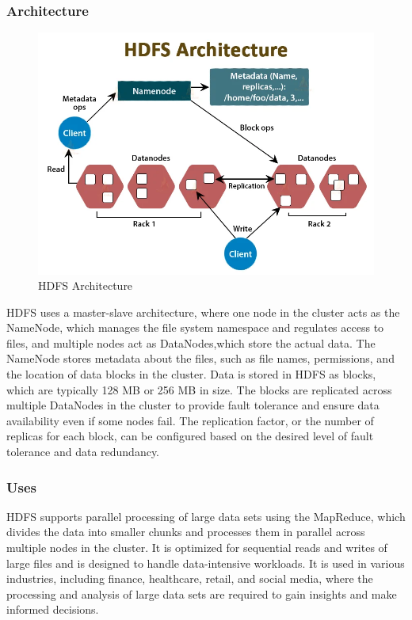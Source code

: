 \documentclass[12pt]{article}
\begin{document}
\subsubsection{Architecture}
\begin{figure}[h!]
    \centering
    \includegraphics[scale = 0.3]{images/HDFS_Architecture.png}
    \caption{HDFS Architecture}
\end{figure}
HDFS uses a master-slave architecture, where one
node in the cluster acts as the NameNode, which manages the file system namespace and regulates access to files, and multiple nodes act as DataNodes,which store the actual data. The NameNode stores metadata about the files, such as file names, permissions, and the location of data blocks in the cluster. Data is stored in HDFS as blocks, which are typically 128 MB or 256 MB in size. The blocks are replicated across multiple DataNodes in the cluster to provide fault tolerance and ensure data availability even if some nodes fail. The replication factor, or the number of replicas for each block, can be configured based on the desired level of fault tolerance and data redundancy. 
\subsubsection{Uses}
HDFS supports parallel processing of large data sets using the MapReduce, which divides the data into smaller chunks and processes them in parallel across
multiple nodes in the cluster. It is optimized for sequential reads and writes of large files and is designed to handle data-intensive workloads. It is used in various industries, including finance, healthcare, retail, and social media, where the processing and analysis of large data sets are required to gain insights and make informed decisions.
\end{document}
